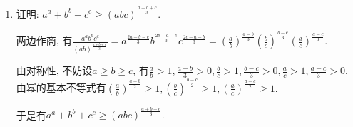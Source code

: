 \documentclass[8pt]{article}
\begin{document}
\begin{enumerate}[label=(\arabic*)]
\begin{enumerate}[label=(\arabic*)]
				\item 证明: $a^a+b^b+c^c\geq\displaystyle (abc)^{\frac{a+b+c}{3}}.$

					两边作商, 有$\displaystyle \frac{a^a b^b c^c}{(ab)^{\frac{a+b+c}{3}}}=a^{\frac{2a-b-c}{3}}b^{\frac{2b-a-c}{3}}c^{\frac{2c-a-b}{3}}=\left(\frac{a}{b}\right)^{\frac{a-b}{3}} \left(\frac{b}{c}\right)^{\frac{b-c}{3}} \left(\frac{a}{c}\right)^{\frac{a-c}{3}}.$

					由对称性, 不妨设$a\geq b\geq c$, 有$\displaystyle \frac{a}{b}>1, \frac{a-b}{3}>0, \frac{b}{c}>1, \frac{b-c}{3}>0, \frac{a}{c}>1, \frac{a-c}{3}>0$, 由幂的基本不等式有$\displaystyle \left(\frac{a}{b}\right)^{\frac{a-b}{2}}\geq 1, \left(\frac{b}{c}\right)^{\frac{b-c}{2}}\geq 1, \left(\frac{a}{c}\right)^{\frac{a-c}{2}}\geq 1.$

					于是有$a^a+b^b+c^c\geq\displaystyle (abc)^{\frac{a+b+c}{3}}.$

			\end{enumerate}
	\end{enumerate}
\end{document}
